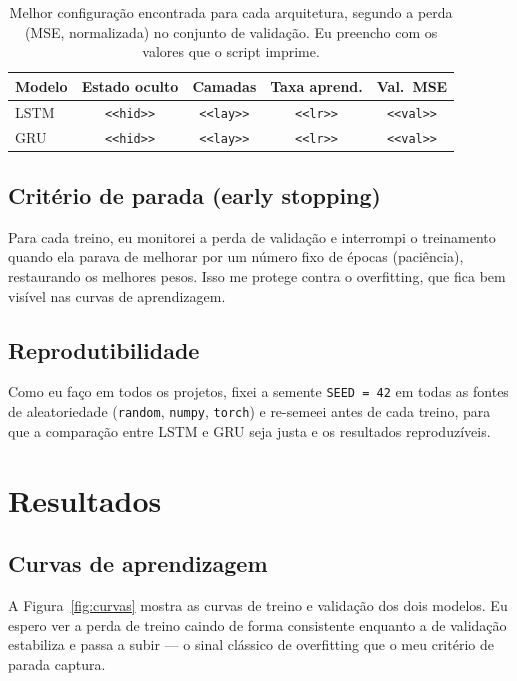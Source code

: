 \documentclass[11pt,a4paper]{article}
\newcommand{\preencher}[1]{{\color{red}\texttt{<<#1>>}}}
\begin{document}
\begin{table}[H]
  \centering
  \caption{Melhor configuração encontrada para cada arquitetura, segundo a
  perda (MSE, normalizada) no conjunto de validação. Eu preencho com os valores
  que o script imprime.}
  \label{tab:busca}
  \begin{tabular}{lcccc}
    \toprule
    Modelo & Estado oculto & Camadas & Taxa aprend. & Val.\ MSE \\
    \midrule
    LSTM & \preencher{hid} & \preencher{lay} & \preencher{lr} & \preencher{val} \\
    GRU  & \preencher{hid} & \preencher{lay} & \preencher{lr} & \preencher{val} \\
    \bottomrule
  \end{tabular}
\end{table}

\subsection{Critério de parada (early stopping)}

Para cada treino, eu monitorei a perda de validação e interrompi o treinamento
quando ela parava de melhorar por um número fixo de épocas (paciência),
restaurando os melhores pesos. Isso me protege contra o overfitting, que fica
bem visível nas curvas de aprendizagem.

\subsection{Reprodutibilidade}

Como eu faço em todos os projetos, fixei a semente \texttt{SEED = 42} em todas
as fontes de aleatoriedade (\texttt{random}, \texttt{numpy}, \texttt{torch}) e
re-semeei antes de cada treino, para que a comparação entre LSTM e GRU seja
justa e os resultados reproduzíveis.

\section{Resultados}

\subsection{Curvas de aprendizagem}

A Figura~\ref{fig:curvas} mostra as curvas de treino e validação dos dois
modelos. Eu espero ver a perda de treino caindo de forma consistente enquanto a
de validação estabiliza e passa a subir --- o sinal clássico de overfitting que
o meu critério de parada captura.
\end{document}
